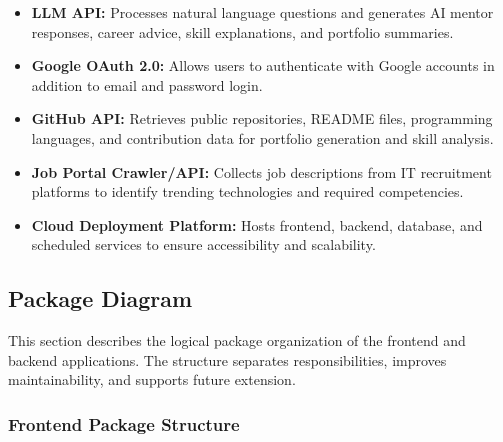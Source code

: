 \begin{itemize}
    \item \textbf{LLM API:} Processes natural language questions and generates AI mentor responses, career advice, skill explanations, and portfolio summaries.
    \item \textbf{Google OAuth 2.0:} Allows users to authenticate with Google accounts in addition to email and password login.
    \item \textbf{GitHub API:} Retrieves public repositories, README files, programming languages, and contribution data for portfolio generation and skill analysis.
    \item \textbf{Job Portal Crawler/API:} Collects job descriptions from IT recruitment platforms to identify trending technologies and required competencies.
    \item \textbf{Cloud Deployment Platform:} Hosts frontend, backend, database, and scheduled services to ensure accessibility and scalability.
\end{itemize}

\subsection{Package Diagram}

This section describes the logical package organization of the frontend and backend applications. The structure separates responsibilities, improves maintainability, and supports future extension.

\subsubsection{Frontend Package Structure}

